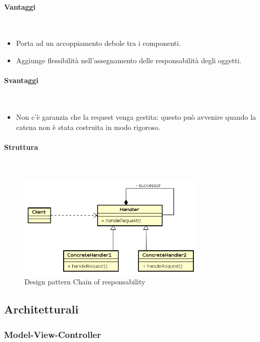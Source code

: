 \paragraph{Vantaggi} \mbox{} \\
\begin{itemize}
\item Porta ad un accoppiamento debole tra i componenti.
\item Aggiunge flessibilità nell’assegnamento delle responsabilità degli oggetti.
\end{itemize}
\paragraph{Svantaggi} \mbox{} \\
\begin{itemize}
\item Non c’è garanzia che la request venga gestita: questo può avvenire quando la catena non è stata costruita in modo rigoroso.
\end{itemize}
\paragraph{Struttura} \mbox{} \\
\begin{figure}[H]
\centering
\includegraphics[width=0.8\textwidth]{res/sections/backend/chainOfResponsability.png}
\caption{Design pattern Chain of responsability}
\end{figure}
\subsection{Architetturali}
\subsubsection{Model-View-Controller}
